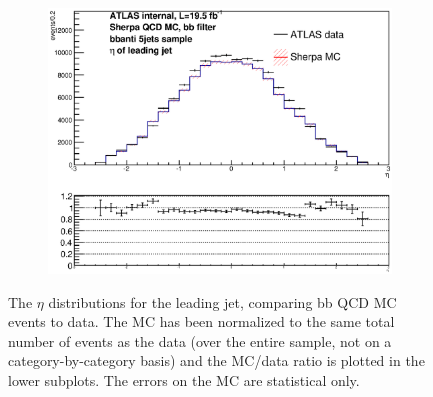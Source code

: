 \begin{figure}[phtb!]
\begin{center}
  \begin{subfigure}[$bbanti$ 5+ jet category]{0.3\textwidth}\includegraphics[width=\textwidth]{MonteCarlo/figures/eta0_bbanti_5jets.eps}\end{subfigure}
  \caption{The $\eta$ distributions for the leading jet, comparing bb QCD MC events to data.  The MC has been normalized
  to the same total number of events as the data (over the entire sample, not on a category-by-category basis)
  and the MC/data ratio is plotted in the lower subplots.  The errors on the MC are statistical only.
  \label{fig:bb_qcd_mc_eta0}}
    \end{center}
\end{figure}



